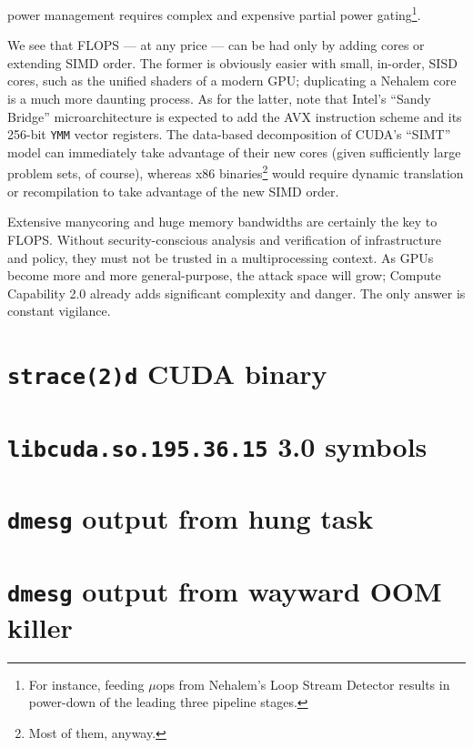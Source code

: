 \documentclass[letterpaper,10pt]{article}
\begin{document}
\begin{multicols}{2}
\begin{itemize}
power management requires complex and expensive partial power gating\footnote{For
instance, feeding $\mu$ops from Nehalem's Loop Stream Detector results in power-down
of the leading three pipeline stages.}.
\end{itemize}
We see that FLOPS --- at any price --- can be had only by adding cores or extending
SIMD order. The former is obviously easier with small, in-order, SISD cores,
such as the unified shaders of a modern GPU\@; duplicating a Nehalem core is a
much more daunting process. As for the latter, note that Intel's ``Sandy
Bridge'' microarchitecture is expected to add the AVX instruction scheme and
its 256-bit \texttt{YMM} vector registers\cite{avx}\cite{fma4}. The data-based decomposition of CUDA's
``SIMT'' model can immediately take advantage of their new cores (given
sufficiently large problem sets, of course), whereas x86 binaries\footnote{Most of them, anyway.} would
require dynamic translation or recompilation to take advantage of the new SIMD
order.

Extensive manycoring and huge memory bandwidths are certainly the key to FLOPS.
Without security-conscious analysis and verification of infrastructure and
policy, they must not be trusted in a multiprocessing context. As GPUs become
more and more general-purpose, the attack space will grow; Compute Capability 2.0
already adds significant complexity and danger. The only answer is constant
vigilance.


\end{multicols}
\appendix
\newpage
\section{\texttt{strace(2)d} CUDA binary}\label{strace}
\newpage
\section{\texttt{libcuda.so.195.36.15} 3.0 symbols}\label{strace}
\section{\texttt{dmesg} output from hung task}\label{oops}
\section{\texttt{dmesg} output from wayward OOM killer}\label{oops}
\end{document}

